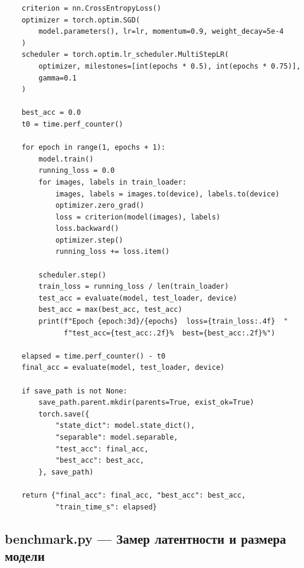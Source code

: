 \begin{verbatim}
    criterion = nn.CrossEntropyLoss()
    optimizer = torch.optim.SGD(
        model.parameters(), lr=lr, momentum=0.9, weight_decay=5e-4
    )
    scheduler = torch.optim.lr_scheduler.MultiStepLR(
        optimizer, milestones=[int(epochs * 0.5), int(epochs * 0.75)],
        gamma=0.1
    )

    best_acc = 0.0
    t0 = time.perf_counter()

    for epoch in range(1, epochs + 1):
        model.train()
        running_loss = 0.0
        for images, labels in train_loader:
            images, labels = images.to(device), labels.to(device)
            optimizer.zero_grad()
            loss = criterion(model(images), labels)
            loss.backward()
            optimizer.step()
            running_loss += loss.item()

        scheduler.step()
        train_loss = running_loss / len(train_loader)
        test_acc = evaluate(model, test_loader, device)
        best_acc = max(best_acc, test_acc)
        print(f"Epoch {epoch:3d}/{epochs}  loss={train_loss:.4f}  "
              f"test_acc={test_acc:.2f}%  best={best_acc:.2f}%")

    elapsed = time.perf_counter() - t0
    final_acc = evaluate(model, test_loader, device)

    if save_path is not None:
        save_path.parent.mkdir(parents=True, exist_ok=True)
        torch.save({
            "state_dict": model.state_dict(),
            "separable": model.separable,
            "test_acc": final_acc,
            "best_acc": best_acc,
        }, save_path)

    return {"final_acc": final_acc, "best_acc": best_acc,
            "train_time_s": elapsed}
\end{verbatim}

\subsection*{benchmark.py — Замер латентности и размера модели}

